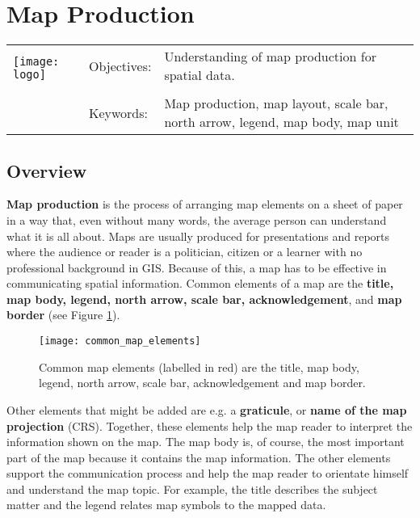 

\section{Map Production}\label{sec:mapproduction}
\begin{tabular}{p{3.5cm}p{6cm}p{6cm}}
\multirow{2}{*}{\texttt{[image: logo]}} & Objectives: &
Understanding of map production for spatial data. \\
& & \\
& Keywords: & 
Map production, map layout, scale bar, north arrow, legend, map body, map
unit  \\
\hline
\end{tabular}

\subsection{Overview}

\textbf{Map production} is the process of arranging map elements on a sheet of paper
in a way that, even without many words, the average person can understand
what it is all about. Maps are usually produced for presentations and reports
where the audience or reader is a politician, citizen or a learner with no
professional background in GIS. Because of this, a map has to be effective in
communicating spatial information. Common elements of a map are the \textbf{title,
map body, legend, north arrow, scale bar, acknowledgement}, and \textbf{map
border} (see Figure \ref{fig:mapelements}).

\begin{figure}[ht]
   \begin{center}
   \caption{Common map elements (labelled in red) are the title, map body,
legend, north arrow, scale bar, acknowledgement and map border.}
\label{fig:mapelements}\smallskip
   \texttt{[image: common\_map\_elements]}
\end{center}
\end{figure}

Other elements that might be added are e.g. a \textbf{graticule}, or
\textbf{name of the map projection} (CRS). Together, these elements help the
map reader to interpret
the information shown on the map. The map body is, of course, the most
important part of the map because it contains the map information. The other
elements support the communication process and help the map reader to
orientate himself and understand the map topic. For example, the title
describes the subject matter and the legend relates map symbols to the mapped
data.  

